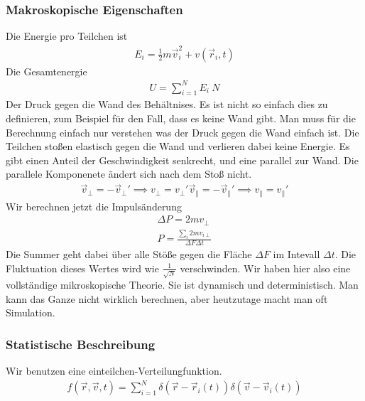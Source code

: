 \subsubsection*{Makroskopische Eigenschaften}
Die Energie pro Teilchen ist
%
\begin{align*}
  E_i = \frac{1}{2} m \vec{v}_i^2 + v(\vec{r}_i, t)
\end{align*}
%
Die Gesamtenergie
%
\begin{align*}
  U = \sum_{i=1}^{N} E_i ~ N
\end{align*}
%
Der Druck gegen die Wand des Behältnises. Es ist nicht so einfach dies
zu definieren, zum Beispiel für den Fall, dass es keine Wand gibt.
Man muss für die Berechnung einfach nur verstehen was der Druck gegen die Wand
einfach ist. Die Teilchen stoßen elastisch gegen die Wand und verlieren dabei keine Energie.
Es gibt einen Anteil der Geschwindigkeit senkrecht, und eine parallel zur Wand.
Die parallele Komponenete ändert sich nach dem Stoß nicht.
%
\begin{align*}
  \vec{v}_\perp = - \vec{v}_\perp' \implies v_\perp = v_\perp '
  \vec{v}_\parallel = - \vec{v}_\parallel' \implies v_\parallel = v_\parallel'
\end{align*}
%
Wir berechnen jetzt die Impulsänderung
%
\begin{align*}
  \Delta P = 2 m v_\perp \\
  P = \frac{\sum_{i}^{} 2 m v_{i \perp}}{\Delta F \Delta t}
\end{align*}
%
Die Summer geht dabei über alle Stöße gegen die Fläche $\Delta F$ im Intevall
$\Delta t$. Die Fluktuation dieses Wertes wird wie $\frac{1}{\sqrt{N}}$ verschwinden.
Wir haben hier also eine vollständige mikroskopische Theorie. Sie ist dynamisch und deterministisch.
Man kann das Ganze nicht wirklich berechnen, aber heutzutage macht man
oft Simulation.

\subsubsection*{Statistische Beschreibung}
Wir benutzen eine einteilchen-Verteilungfunktion.
%
\begin{align*}
  f(\vec{r},\vec{v},t) = \sum_{i=1}^{N} \delta(\vec{r} - \vec{r}_i(t))\delta(\vec{v}-\vec{v}_i(t))
\end{align*}
%

